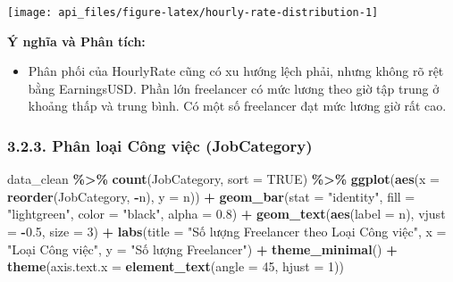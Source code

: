 \documentclass[
]{article}
\newenvironment{Shaded}{\begin{snugshade}}{\end{snugshade}}
\newcommand{\AttributeTok}[1]{\textcolor[rgb]{0.13,0.29,0.53}{#1}}
\newcommand{\ConstantTok}[1]{\textcolor[rgb]{0.56,0.35,0.01}{#1}}
\newcommand{\DecValTok}[1]{\textcolor[rgb]{0.00,0.00,0.81}{#1}}
\newcommand{\FloatTok}[1]{\textcolor[rgb]{0.00,0.00,0.81}{#1}}
\newcommand{\FunctionTok}[1]{\textcolor[rgb]{0.13,0.29,0.53}{\textbf{#1}}}
\newcommand{\NormalTok}[1]{#1}
\newcommand{\SpecialCharTok}[1]{\textcolor[rgb]{0.81,0.36,0.00}{\textbf{#1}}}
\newcommand{\StringTok}[1]{\textcolor[rgb]{0.31,0.60,0.02}{#1}}
\providecommand{\tightlist}{%
  \setlength{\itemsep}{0pt}\setlength{\parskip}{0pt}}
\begin{document}
\begin{center}\texttt{[image: api\_files/figure-latex/hourly-rate-distribution-1]} \end{center}

\textbf{Ý nghĩa và Phân tích:}

\begin{itemize}
\tightlist
\item
  Phân phối của HourlyRate cũng có xu hướng lệch phải, nhưng không rõ
  rệt bằng EarningsUSD. Phần lớn freelancer có mức lương theo giờ tập
  trung ở khoảng thấp và trung bình. Có một số freelancer đạt mức lương
  giờ rất cao.
\end{itemize}

\subsubsection{3.2.3. Phân loại Công việc
(JobCategory)}\label{phuxe2n-loux1ea1i-cuxf4ng-viux1ec7c-jobcategory}

\begin{Shaded}
\begin{Highlighting}[]
\NormalTok{data\_clean }\SpecialCharTok{\%\textgreater{}\%}
  \FunctionTok{count}\NormalTok{(JobCategory, }\AttributeTok{sort =} \ConstantTok{TRUE}\NormalTok{) }\SpecialCharTok{\%\textgreater{}\%}
  \FunctionTok{ggplot}\NormalTok{(}\FunctionTok{aes}\NormalTok{(}\AttributeTok{x =} \FunctionTok{reorder}\NormalTok{(JobCategory, }\SpecialCharTok{{-}}\NormalTok{n), }\AttributeTok{y =}\NormalTok{ n)) }\SpecialCharTok{+}
  \FunctionTok{geom\_bar}\NormalTok{(}\AttributeTok{stat =} \StringTok{"identity"}\NormalTok{, }\AttributeTok{fill =} \StringTok{"lightgreen"}\NormalTok{, }\AttributeTok{color =} \StringTok{"black"}\NormalTok{, }\AttributeTok{alpha =} \FloatTok{0.8}\NormalTok{) }\SpecialCharTok{+}
  \FunctionTok{geom\_text}\NormalTok{(}\FunctionTok{aes}\NormalTok{(}\AttributeTok{label =}\NormalTok{ n), }\AttributeTok{vjust =} \SpecialCharTok{{-}}\FloatTok{0.5}\NormalTok{, }\AttributeTok{size =} \DecValTok{3}\NormalTok{) }\SpecialCharTok{+}
  \FunctionTok{labs}\NormalTok{(}\AttributeTok{title =} \StringTok{"Số lượng Freelancer theo Loại Công việc"}\NormalTok{,}
       \AttributeTok{x =} \StringTok{"Loại Công việc"}\NormalTok{,}
       \AttributeTok{y =} \StringTok{"Số lượng Freelancer"}\NormalTok{) }\SpecialCharTok{+}
  \FunctionTok{theme\_minimal}\NormalTok{() }\SpecialCharTok{+}
  \FunctionTok{theme}\NormalTok{(}\AttributeTok{axis.text.x =} \FunctionTok{element\_text}\NormalTok{(}\AttributeTok{angle =} \DecValTok{45}\NormalTok{, }\AttributeTok{hjust =} \DecValTok{1}\NormalTok{))}
\end{Highlighting}
\end{Shaded}
\end{document}
